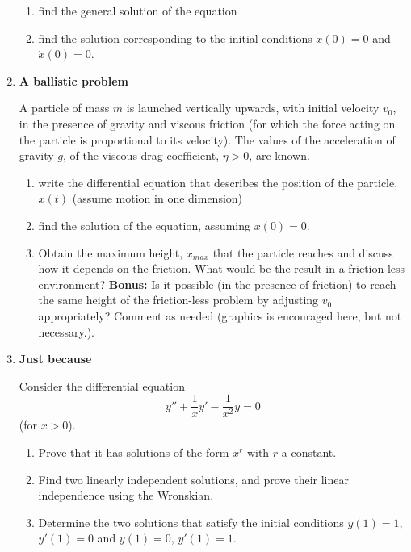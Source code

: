 \documentclass[fleqn]{article}
\begin{document}
\begin{enumerate}
\begin{enumerate}
      \item find the general solution of the equation 
      
      \item find the solution corresponding to the initial conditions $x(0)=0$ and $\dot x(0)=0$. 
      \end{enumerate}
    
    
    \item  {\bf A ballistic problem} 

    A particle of mass $m$ is launched vertically upwards, with initial velocity $v_0$, in the presence of gravity and viscous friction (for which the force acting on the particle is proportional to its velocity). The values of the acceleration of gravity $g$, of the viscous drag coefficient, $\eta>0$, are known. 
      \begin{enumerate}
      
      \item write the differential equation that describes the position of the particle, $x(t)$ (assume motion in one dimension)
      
      \item find the solution of the equation, assuming $x(0)=0$. 
      
      \item  Obtain the maximum height, $x_{max}$ that the particle reaches and discuss how it depends on the friction. What would be the result in a friction-less environment?  {\bf Bonus:} Is it possible (in the presence of friction) to reach the same height of the friction-less problem by adjusting $v_0$ appropriately? Comment as needed (graphics is encouraged here, but not necessary.). 
      \end{enumerate}
    
    \item {\bf Just because} 

    Consider the differential equation 
    $$
    y'' + \frac{1}{x} y' - \frac{1}{x^2} y=0
    $$
    (for $x>0$).
      \begin{enumerate}
      \item Prove that it has solutions of the form $x^r$ with $r$  a constant. 
      
      \item Find two linearly independent solutions, and  prove their 
      linear independence using the Wronskian. 
      
      \item  Determine the two solutions that satisfy the initial conditions
      $y (1) = 1$, $y'(1) = 0$  and $y (1) = 0$, $y'(1) = 1$. 
      \end{enumerate}

  \end{enumerate}
\end{document}
